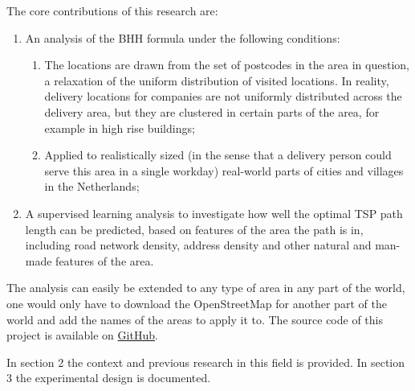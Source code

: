 The core contributions of this research are:
\begin{enumerate}
	\item An analysis of the BHH formula under the following conditions:
	      \begin{enumerate}
		      \item The locations are drawn from the set of postcodes in the area in question, a relaxation of the uniform distribution of visited
		            locations. In reality, delivery locations for companies are not uniformly distributed across the delivery area, but they are clustered
		            in certain parts of the area, for example in high rise buildings;
		      \item Applied to realistically sized (in the sense that a delivery person could serve this area in a single workday) real-world parts of
		            cities and villages in the Netherlands;
	      \end{enumerate}
	\item A supervised learning analysis to investigate how well the optimal TSP path length can be
	      predicted, based on features of the area the path is in, including road network density,
	      address density and other natural and man-made features of the area.
\end{enumerate}
The analysis can easily be extended to any type of area in any part of the world, one would only
have to download the OpenStreetMap \citep{openstreetmap} for another part of the world and add the names of the areas
to apply it to. The source code of this project is available on
\href{https://github.com/koen1859/Bsc_Thesis}{GitHub}.

In section 2 the context and previous research in this field is provided.
In section 3 the experimental design is documented.
